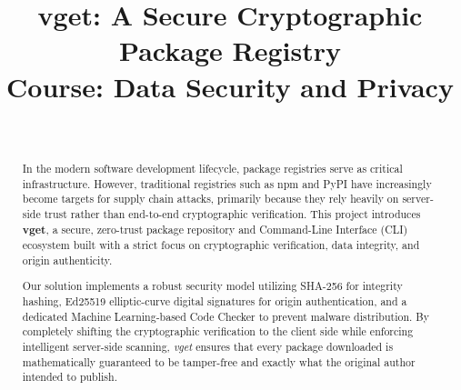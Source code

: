 \documentclass[conference]{IEEEtran}
\begin{document}
\title{vget: A Secure Cryptographic Package Registry\\[0.3em]
\normalsize Course: Data Security and Privacy}

\author{
\\[1cm]
}

\maketitle

\begin{abstract}
In the modern software development lifecycle, package registries serve as critical infrastructure. However, traditional registries such as npm and PyPI have increasingly become targets for supply chain attacks, primarily because they rely heavily on server-side trust rather than end-to-end cryptographic verification. This project introduces \textbf{vget}, a secure, zero-trust package repository and Command-Line Interface (CLI) ecosystem built with a strict focus on cryptographic verification, data integrity, and origin authenticity.

Our solution implements a robust security model utilizing SHA-256 for integrity hashing, Ed25519 elliptic-curve digital signatures for origin authentication, and a dedicated Machine Learning-based Code Checker to prevent malware distribution. By completely shifting the cryptographic verification to the client side while enforcing intelligent server-side scanning, \textit{vget} ensures that every package downloaded is mathematically guaranteed to be tamper-free and exactly what the original author intended to publish.
\end{abstract}
\end{document}
